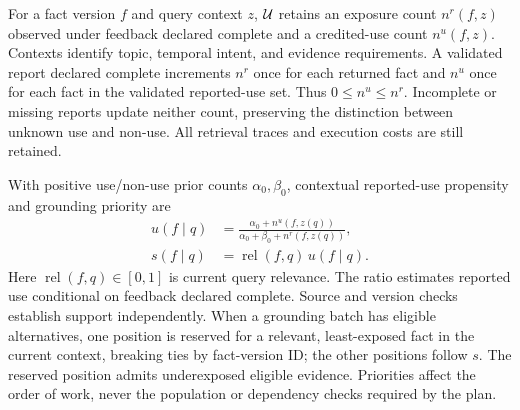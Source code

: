\label{sec:secondorder}

For a fact version $f$ and query context $z$, $\mathcal{U}$ retains an
exposure count $n^r(f,z)$ observed under feedback declared complete and a
credited-use count $n^u(f,z)$. Contexts identify topic, temporal intent, and evidence
requirements. A validated report declared complete increments $n^r$ once for
each returned fact and $n^u$ once for each fact in the validated reported-use set.
Thus $0\leq n^u\leq n^r$. Incomplete or missing reports update neither count,
preserving the distinction between unknown use and non-use. All retrieval traces and
execution costs are still retained.

With positive use/non-use prior counts $\alpha_0,\beta_0$,
contextual reported-use propensity and grounding priority are
\begin{equation}
\label{eq:pi}
\begin{aligned}
u(f\mid q)&=\frac{\alpha_0+n^u(f,z(q))}{\alpha_0+\beta_0+n^r(f,z(q))},\\
s(f\mid q)&=\operatorname{rel}(f,q)\,u(f\mid q).
\end{aligned}
\end{equation}
Here $\operatorname{rel}(f,q)\in[0,1]$ is current query relevance.
The ratio estimates reported use conditional on feedback declared complete.
Source and version checks establish support independently.
When a grounding batch has eligible alternatives, one position is
reserved for a relevant, least-exposed fact in the current context,
breaking ties by fact-version ID; the other positions follow $s$.
The reserved position admits underexposed eligible evidence.
Priorities affect the order of work, never the population or dependency
checks required by the plan.
